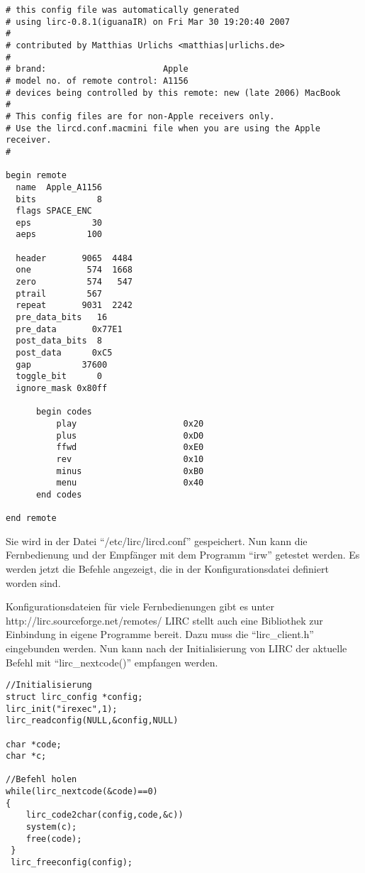 \begin{lstlisting}[label=infra_config,caption=Fernbedienung Konfiguration]
# this config file was automatically generated
# using lirc-0.8.1(iguanaIR) on Fri Mar 30 19:20:40 2007
#
# contributed by Matthias Urlichs <matthias|urlichs.de>
#
# brand:                       Apple
# model no. of remote control: A1156
# devices being controlled by this remote: new (late 2006) MacBook
#
# This config files are for non-Apple receivers only.
# Use the lircd.conf.macmini file when you are using the Apple receiver.
# 

begin remote
  name  Apple_A1156
  bits            8
  flags SPACE_ENC
  eps            30
  aeps          100

  header       9065  4484
  one           574  1668
  zero          574   547
  ptrail        567
  repeat       9031  2242
  pre_data_bits   16
  pre_data       0x77E1
  post_data_bits  8
  post_data      0xC5
  gap          37600
  toggle_bit      0
  ignore_mask 0x80ff

      begin codes
          play                     0x20
          plus                     0xD0
          ffwd                     0xE0
          rev                      0x10
          minus                    0xB0
          menu                     0x40
      end codes

end remote
\end{lstlisting}

Sie wird in der Datei "`/etc/lirc/lircd.conf"' gespeichert.
\newline
Nun kann die Fernbedienung und der Empfänger mit dem Programm "`irw"' getestet werden. Es werden jetzt die Befehle angezeigt, die in der Konfigurationsdatei definiert worden sind.

Konfigurationsdateien für viele Fernbedienungen gibt es unter
http://lirc.sourceforge.net/remotes/
\newline
\newline
LIRC stellt auch eine Bibliothek zur Einbindung in eigene Programme bereit. Dazu muss die "`lirc\_client.h"' eingebunden werden.
\newline
\newline
Nun kann nach der Initialisierung von LIRC der aktuelle Befehl mit "`lirc\_nextcode()"' empfangen werden.
\begin{lstlisting}[label=infra_quellcode,caption=LIRC Programmierung]
//Initialisierung
struct lirc_config *config;
lirc_init("irexec",1);
lirc_readconfig(NULL,&config,NULL)

char *code;
char *c;

//Befehl holen
while(lirc_nextcode(&code)==0)
{
	lirc_code2char(config,code,&c))
	system(c);
	free(code);
 }
 lirc_freeconfig(config);
\end{lstlisting}
